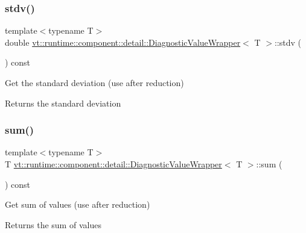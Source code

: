 \subsubsection{\texorpdfstring{stdv()}{stdv()}}
{\footnotesize\ttfamily template$<$typename T$>$ \\
double \hyperlink{structvt_1_1runtime_1_1component_1_1detail_1_1_diagnostic_value_wrapper}{vt\+::runtime\+::component\+::detail\+::\+Diagnostic\+Value\+Wrapper}$<$ T $>$\+::stdv (\begin{DoxyParamCaption}{ }\end{DoxyParamCaption}) const\hspace{0.3cm}{\ttfamily [inline]}}



Get the standard deviation (use after reduction) 

\begin{DoxyReturn}{Returns}
the standard deviation 
\end{DoxyReturn}
\mbox{\label{structvt_1_1runtime_1_1component_1_1detail_1_1_diagnostic_value_wrapper_a6cb8450ac2aeb9020288f3287af224d7}} 
\subsubsection{\texorpdfstring{sum()}{sum()}}
{\footnotesize\ttfamily template$<$typename T$>$ \\
T \hyperlink{structvt_1_1runtime_1_1component_1_1detail_1_1_diagnostic_value_wrapper}{vt\+::runtime\+::component\+::detail\+::\+Diagnostic\+Value\+Wrapper}$<$ T $>$\+::sum (\begin{DoxyParamCaption}{ }\end{DoxyParamCaption}) const\hspace{0.3cm}{\ttfamily [inline]}}



Get sum of values (use after reduction) 

\begin{DoxyReturn}{Returns}
the sum of values 
\end{DoxyReturn}
\mbox{\label{structvt_1_1runtime_1_1component_1_1detail_1_1_diagnostic_value_wrapper_a492b3859a7654413bf88c1338bdfd643}} 
